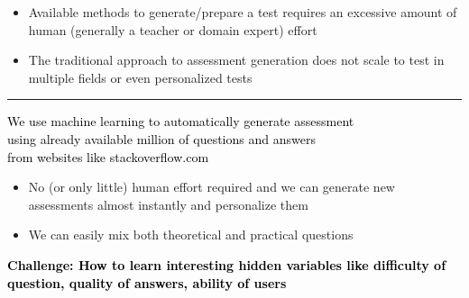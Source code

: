 \documentclass[sansserif,mathserif]{beamer}
\renewcommand{\subtitle}[1]{\vspace{6mm}{\large \bf \color{subtitlecolor} #1}}
\newcommand{\holine}{\vspace{0.3cm} \hrule height 2pt \vspace{-0.0cm}}
\begin{document}
\begin{frame}
\begin{columns}
\begin{column}{0.309\textwidth}
\begin{itemize}
    \item Available methods to generate/prepare a test requires an excessive amount of human (generally a teacher or domain expert) effort 
\item The traditional approach to assessment generation does not scale to test in multiple fields or even personalized tests
\\[0.1cm]
\end{itemize}


\vspace{0.0cm}


\holine 
\vspace{-0.1cm}

\subtitle{Proposed Solution}
\vspace{0.0cm}

\begin{exampleblock}{\vspace{-.4cm}\begin{center}\textcolor{black}{We use machine learning to automatically generate assessment \\ using already available million of questions and answers \\ from websites like stackoverflow.com}\end{center}\vspace{-.2cm}}
\vspace{-0.2cm}
\end{exampleblock}
\begin{itemize}
    \item No (or only little) human effort required and we can generate new assessments almost instantly and personalize them
    \item We can easily mix both theoretical and practical questions

\end{itemize}

\begin{alertblock}{\vspace{-.4cm}\begin{center}\bf \textcolor{black}{Challenge: How to learn interesting hidden variables like difficulty of question, quality of answers, ability of users}\end{center}\vspace{-.2cm}}
\vspace{-0.15cm}
\end{alertblock}
\vspace{0.1cm}


\end{column}
\end{columns}
\end{frame}
\end{document}
